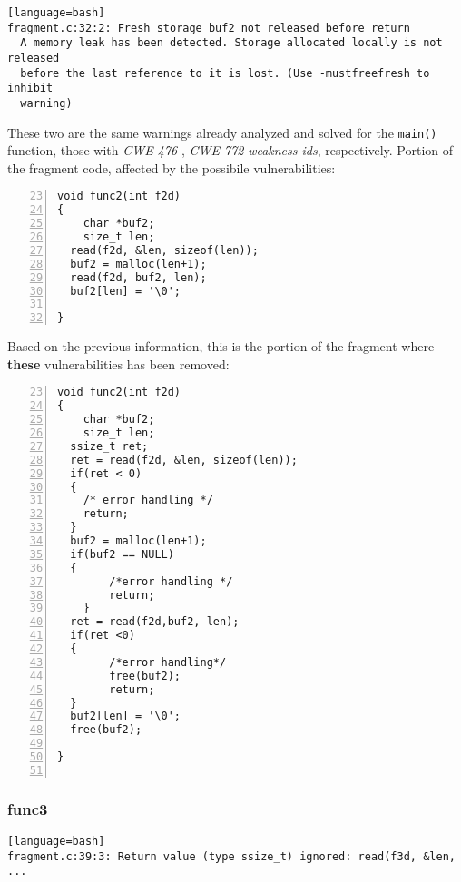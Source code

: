 \documentclass[a4paper,12pt]{article}
\begin{document}
\begin{lstlisting}[style=DOS][language=bash]
fragment.c:32:2: Fresh storage buf2 not released before return
  A memory leak has been detected. Storage allocated locally is not released
  before the last reference to it is lost. (Use -mustfreefresh to inhibit
  warning)
\end{lstlisting}
These two are the same warnings already analyzed and solved for the \texttt{main()} function, those with \textit{CWE-476} \cite{CWE476}, \textit{CWE-772} \cite{CWE772} \textit{weakness ids}, respectively.
\noindent
Portion of the fragment code, affected by the possibile vulnerabilities:
\begin{lstlisting}[style=c,numbers=left,firstnumber=23,linebackgroundcolor={
\ifnum\value{lstnumber}=27\color{red}\fi
\ifnum\value{lstnumber}=29\color{red}\fi
\ifnum\value{lstnumber}=32\color{red}\fi
\ifnum\value{lstnumber}=28\color{red}\fi
}]
void func2(int f2d)
{
	char *buf2;
	size_t len;
  read(f2d, &len, sizeof(len));
  buf2 = malloc(len+1); 
  read(f2d, buf2, len); 
  buf2[len] = '\0';

}

\end{lstlisting}

\newpage
\noindent
Based on the previous information, this is the portion of the fragment where \textbf{these} vulnerabilities has been removed:
\begin{lstlisting}[style=c,numbers=left,firstnumber=23,linebackgroundcolor={
\ifnum\value{lstnumber}=28\color{green}\fi
\ifnum\value{lstnumber}=35\color{green}\fi
\ifnum\value{lstnumber}=40\color{green}\fi
\ifnum\value{lstnumber}=48\color{green}\fi
\ifnum\value{lstnumber}=44\color{green}\fi
}]
void func2(int f2d)
{
	char *buf2;
	size_t len;
  ssize_t ret;
  ret = read(f2d, &len, sizeof(len));
  if(ret < 0)
  {
  	/* error handling */
  	return;
  }
  buf2 = malloc(len+1);
  if(buf2 == NULL)
  {	
		/*error handling */
		return;
	} 
  ret = read(f2d,buf2, len);
  if(ret <0)
  {
		/*error handling*/
		free(buf2);
		return;  
  }
  buf2[len] = '\0';
  free(buf2);

}


\end{lstlisting}

\newpage
\noindent
\subsubsection{func3}

   

\begin{lstlisting}[style=DOS][language=bash]
fragment.c:39:3: Return value (type ssize_t) ignored: read(f3d, &len, ...
\end{lstlisting}
\end{document}
